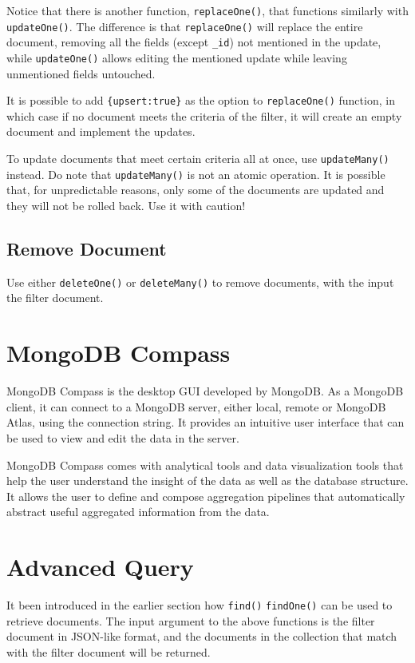 Notice that there is another function, \verb|replaceOne()|, that functions similarly with \verb|updateOne()|. The difference is that \verb|replaceOne()| will replace the entire document, removing all the fields (except \verb|_id|) not mentioned in the update, while \verb|updateOne()| allows editing the mentioned update while leaving unmentioned fields untouched.

It is possible to add \verb|{upsert:true}| as the option to \verb|replaceOne()| function, in which case if no document meets the criteria of the filter, it will create an empty document and implement the updates.

To update documents that meet certain criteria all at once, use \verb|updateMany()| instead. Do note that \verb|updateMany()| is not an atomic operation. It is possible that, for unpredictable reasons, only some of the documents are updated and they will not be rolled back. Use it with caution!

\subsection{Remove Document}

Use either \verb|deleteOne()| or \verb|deleteMany()| to remove documents, with the input the filter document.

\section{MongoDB Compass}

MongoDB Compass is the desktop GUI developed by MongoDB. As a MongoDB client, it can connect to a MongoDB server, either local, remote or MongoDB Atlas, using the connection string. It provides an intuitive user interface that can be used to view and edit the data in the server. 

MongoDB Compass comes with analytical tools and data visualization tools that help the user understand the insight of the data as well as the database structure. It allows the user to define and compose aggregation pipelines that automatically abstract useful aggregated information from the data.

\section{Advanced Query}

It been introduced in the earlier section how \verb|find()| \verb|findOne()| can be used to retrieve documents. The input argument to the above functions is the filter document in JSON-like format, and the documents in the collection that match with the filter document will be returned.

